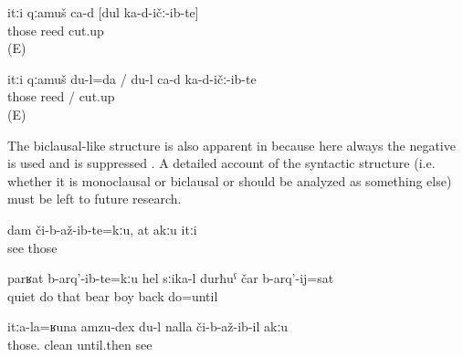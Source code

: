 \begin{exe}
	\ex	\label{ex:It is the reed that I cut analytic}
	\gll	itːi	qːamuš	ca-d	[dul		ka-d-ičː-ib-te]	\\
		those	reed 			cut.up\\
	\glt	{} (E) 

	\ex	\label{ex:It is me who cut the reed analytic}
	\gll	itːi	qːamuš		du-l=da	/ du-l ca-d ka-d-ičː-ib-te	\\
		those	reed		/   cut.up\\
	\glt	{} (E)
\end{exe}

The biclausal-like structure is also apparent in  because here always the negative   is used and  is suppressed . A detailed account of the syntactic structure (i.e. whether it is monoclausal or biclausal or should be analyzed as something else) must be left to future research.

\begin{exe}
	\ex	\label{ex:I did not see them, you also (did not see them)}
	\gll	dam	či-b-až-ib-te=kːu,	at	akːu	itːi\\
			see		 	those\\
	\glt	{}

	\ex	\label{ex:‎The bear was not quiet before they did give it its cub back}
	\gll	parʁat	b-arq'-ib-te=kːu	hel	sːika-l		durħuˁ	čar	b-arq'-ij=sat\\
		quiet	do	that	bear	boy	back	do=until\\
	\glt	{}

	\ex	\label{ex:‎A cleanness like theirs I have seen nowhere analytic}
	\gll	itːa-la=ʁuna	amzu-dex	du-l	nalla	či-b-až-ib-il	akːu\\
		those.	clean		until.then	see	\\
	\glt	{}
\end{exe}



